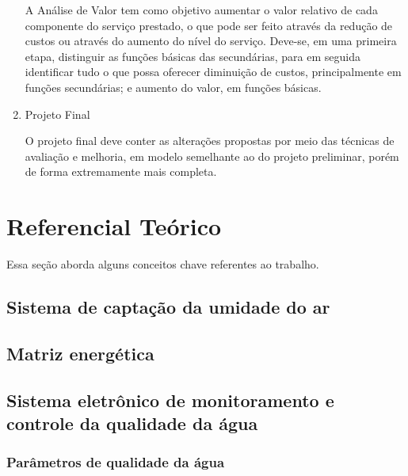 \begin{enumerate}
    A Análise de Valor tem como objetivo aumentar o valor relativo de cada componente do serviço prestado, o que pode 
    ser feito através da redução de custos ou através do aumento do nível do serviço. Deve-se, em uma primeira etapa,
    distinguir as funções básicas das secundárias, para em seguida identificar tudo o que possa oferecer diminuição de custos,
    principalmente em funções secundárias; e aumento do valor, em funções básicas.
    
  \item Projeto Final
  
    O projeto final deve conter as alterações propostas por meio das técnicas de avaliação e melhoria, em modelo semelhante
    ao do projeto preliminar, porém de forma extremamente mais completa.
    
  \end{enumerate}

  
  \section{Referencial Teórico}
  
    Essa seção aborda alguns conceitos chave referentes ao trabalho.
    
    \subsection{Sistema de captação da umidade do ar}
    
      
    
    \pagebreak
    \subsection{Matriz energética}
    
      
    
    \pagebreak
    \subsection{Sistema eletrônico de monitoramento e controle da qualidade da água}
      
      \subsubsection{Parâmetros de qualidade da água}
        
        
      
